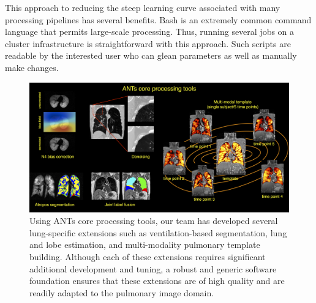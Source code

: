 \documentclass[11pt,]{article}
\newenvironment{Shaded}{\begin{snugshade}}{\end{snugshade}}
\newcommand{\KeywordTok}[1]{\textcolor[rgb]{0.13,0.29,0.53}{\textbf{{#1}}}}
\newcommand{\CommentTok}[1]{\textcolor[rgb]{0.56,0.35,0.01}{\textit{{#1}}}}
\newcommand{\NormalTok}[1]{{#1}}
\begin{document}
\begin{Shaded}
\end{Shaded}

This approach to reducing the steep learning curve associated with many
processing pipelines has several benefits. Bash is an extremely common
command language that permits large-scale processing. Thus, running
several jobs on a cluster infrastructure is straightforward with this
approach. Such scripts are readable by the interested user who can glean
parameters as well as manually make changes.

\begin{figure}[htbp]
\centering
\includegraphics{Figs/coreANtsToolsLung.png}
\caption{Using ANTs core processing tools, our team has developed
several lung-specific extensions such as ventilation-based segmentation,
lung and lobe estimation, and multi-modality pulmonary template
building. Although each of these extensions requires significant
additional development and tuning, a robust and generic software
foundation ensures that these extensions are of high quality and are
readily adapted to the pulmonary image domain.}
\end{figure}
\end{document}
